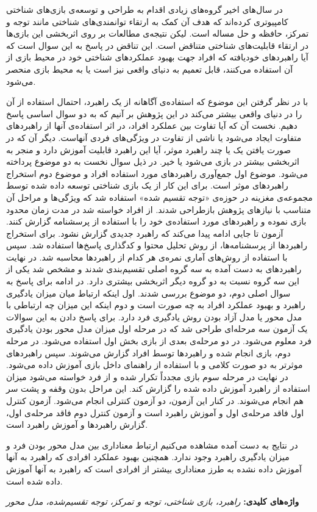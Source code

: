 \documentclass[twoside, a4paper,11pt]{book}
\numberwithin{equation}{chapter}
\numberwithin{table}{chapter}
\numberwithin{figure}{chapter}
\numberwithin{equation}{chapter}
\begin{document}
\begin{spacing}{1.5}

در سال‌های اخیر گروه‌های زیادی اقدام به طراحی و توسعه‌ی بازی‌های شناختی کامپیوتری کرده‌اند که هدف آن کمک به ارتقاء توانمندی‌های شناختی مانند توجه و تمرکز، حافظه و حل مساله است. لیکن نتیجه‌ی مطالعات بر روی اثربخشی این بازی‌ها در ارتقاء قابلیت‌های شناختی متناقض است. این تناقض در پاسخ به این سوال است که آیا راهبردهای خودیافته که افراد جهت بهبود عملکردهای شناختی خود در محیط بازی از آن استفاده می‌کنند، قابل تعمیم به دنیای واقعی نیز است یا به محیط بازی منحصر می‌شود. 

با در نظر گرفتن این موضوع که استفاده‌ی آگاهانه از یک راهبرد، احتمال استفاده از آن را در دنیای واقعی بیشتر می‌کند در این پژوهش بر آنیم که به دو سوال اساسی پاسخ دهیم. نخست آن که  آیا تفاوت بین عملکرد افراد، در اثر استفاده‌ی آنها از راهبردهای متفاوت ایجاد می‌شود یا ناشی از تفاوت در ویژگی‌های فردی آنهاست. دیگر آن که در صورت یافتن یک یا چند راهبرد موثر، آیا این راهبرد قابلیت آموزش دارد و منجر به اثربخشی بیشتر در بازی می‌شود یا خیر. در ذیل سوال نخست به دو موضوع پرداخته می‌شود. موضوع اول جمع‌آوری راهبردهای مورد استفاده افراد و موضوع دوم استخراج راهبردهای موثر است. برای این کار از یک بازی شناختی توسعه داده شده توسط مجموعه‌ی مغزینه در حوزه‌ی «توجه تقسیم شده» استفاده شد که ویژگی‌ها و مراحل آن متناسب با نیازهای پژوهش بازطراحی شدند. از افراد خواسته شد در مدت زمان محدود بازی نموده و راهبردهای مورد استفاده‌ی خود را با استفاده از پرسشنامه گزارش کنند. آزمون تا جایی ادامه پیدا می‌کند که راهبرد جدیدی گزارش نشود. برای استخراج راهبردها از پرسشنامه‌ها، از روش تحلیل محتوا و کدگذاری پاسخ‌ها استفاده شد. سپس با استفاده از روش‌های آماری نمره‌ی هر کدام از راهبردها محاسبه شد. در نهایت راهبردهای به دست آمده به سه گروه اصلی تقسیم‌بندی شدند و مشخص شد یکی از این سه گروه نسبت به دو گروه دیگر اثربخشی بیشتری دارد. در ادامه برای پاسخ به سوال اصلی دوم، دو موضوع بررسی شدند. اول اینکه ارتباط میان میزان یادگیری راهبرد و بهبود عملکرد افراد به چه صورت است و دوم اینکه این میزان چه ارتباطی با مدل محور یا مدل آزاد بودن روش یادگیری فرد دارد. برای پاسخ دادن به این سوالات یک آزمون سه مرحله‌ای طراحی شد که در  مرحله اول میزان مدل محور بودن یادگیری فرد معلوم می‌شود. در دو مرحله‌ی بعدی از بازی بخش اول استفاده می‌شود. در  مرحله دوم، بازی انجام شده و راهبردها توسط افراد گزارش می‌شوند. سپس راهبردهای موثرتر به دو صورت کلامی و با استفاده از راهنمای داخل بازی آموزش داده می‌شود. در نهایت در مرحله سوم بازی مجدداً تکرار شده و از فرد خواسته می‌شود میزان استفاده از راهبرد آموزش داده شده را گزارش کند. این مراحل بدون وقفه و پشت سر هم انجام می‌شوند. در کنار این آزمون، دو آزمون کنترلی انجام می‌شود. آزمون کنترل اول فاقد مرحله‌ی اول و آموزش راهبرد است و آزمون کنترل دوم فاقد مرحله‌ی اول، گزارش راهبردها و آموزش راهبرد است.  

در نتایج به دست آمده مشاهده می‌کنیم ارتباط معناداری بین مدل محور بودن فرد و میزان یادگیری راهبرد وجود ندارد. همچنین بهبود عملکرد افرادی که راهبرد به آنها آموزش داده نشده به طرز معناداری بیشتر از افرادی است که راهبرد به آنها آموزش داده شده است.

\textbf{واژه‌های کلیدی: }\textit{راهبرد، بازی شناختی، توجه و تمرکز، توجه تقسیم‌شده، مدل محور}
\end{spacing}
\end{document}
